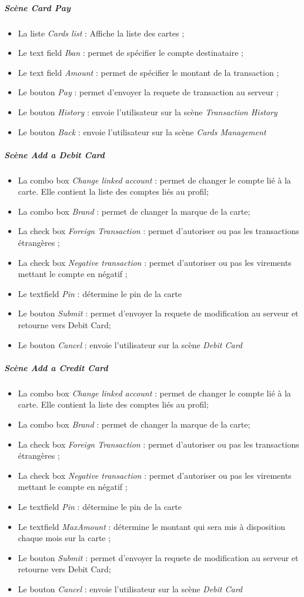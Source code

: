 \documentclass{article}
\newcommand{\navbutton}[2]{Le bouton \emph{#1} : envoie l'utilisateur sur la scène \emph{#2}}
\begin{document}
\subparagraph{Scène \emph{Card Pay}}
\begin{itemize}
\item La liste \emph{Cards list} : Affiche la liste des cartes ;
\item Le text field \emph{Iban} : permet de spécifier le compte destinataire ;
\item Le text field \emph{Amount} : permet de spécifier le montant de la transaction ;
\item Le bouton \emph{Pay} : permet d'envoyer la requete de transaction au serveur ;
\item \navbutton{History}{Transaction History}
\item \navbutton{Back}{Cards Management}
\end{itemize}

\subparagraph{Scène \emph{Add a Debit Card}}
\begin{itemize}
\item La combo box \emph{Change linked account} : permet de changer le compte lié à la carte. Elle 
contient la liste des comptes liés au profil;
\item La combo box \emph{Brand} : permet de changer la marque de la carte;
\item La check box \emph{Foreign Transaction} : permet d'autoriser ou pas les transactions étrangères ;
\item La check box \emph{Negative transaction} : permet d'autoriser ou pas les virements mettant le compte en négatif ;
\item Le textfield \emph{Pin} : détermine le pin de la carte
\item Le bouton \emph{Submit} : permet d'envoyer la requete de modification au serveur et retourne vers Debit Card;
\item \navbutton{Cancel}{Debit Card}
\end{itemize}

\subparagraph{Scène \emph{Add a Credit Card}}
\begin{itemize}
\item La combo box \emph{Change linked account} : permet de changer le compte lié à la carte. Elle 
contient la liste des comptes liés au profil;
\item La combo box \emph{Brand} : permet de changer la marque de la carte;
\item La check box \emph{Foreign Transaction} : permet d'autoriser ou pas les transactions étrangères ;
\item La check box \emph{Negative transaction} : permet d'autoriser ou pas les virements mettant le compte en négatif ;
\item Le textfield \emph{Pin} : détermine le pin de la carte
\item Le textfield \emph{MaxAmount} : détermine le montant qui sera mis à disposition chaque mois sur la carte ;
\item Le bouton \emph{Submit} : permet d'envoyer la requete de modification au serveur et retourne vers Debit Card;
\item \navbutton{Cancel}{Debit Card}
\end{itemize}
\end{document}
